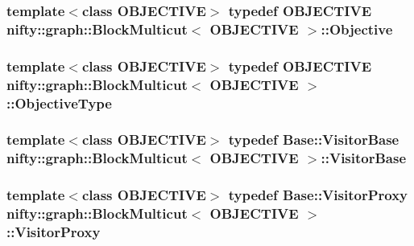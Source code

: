 \subsubsection[{Objective}]{\setlength{\rightskip}{0pt plus 5cm}template$<$class O\+B\+J\+E\+C\+T\+I\+V\+E$>$ typedef O\+B\+J\+E\+C\+T\+I\+V\+E {\bf nifty\+::graph\+::\+Block\+Multicut}$<$ O\+B\+J\+E\+C\+T\+I\+V\+E $>$\+::{\bf Objective}}\label{classnifty_1_1graph_1_1BlockMulticut_a5a0258cebb392718a4565551cd43ab89}
\hypertarget{classnifty_1_1graph_1_1BlockMulticut_a1b38a95ca33ba1eaed19e994484c58fc}{}
\subsubsection[{Objective\+Type}]{\setlength{\rightskip}{0pt plus 5cm}template$<$class O\+B\+J\+E\+C\+T\+I\+V\+E$>$ typedef O\+B\+J\+E\+C\+T\+I\+V\+E {\bf nifty\+::graph\+::\+Block\+Multicut}$<$ O\+B\+J\+E\+C\+T\+I\+V\+E $>$\+::{\bf Objective\+Type}}\label{classnifty_1_1graph_1_1BlockMulticut_a1b38a95ca33ba1eaed19e994484c58fc}
\hypertarget{classnifty_1_1graph_1_1BlockMulticut_a7338bedc1f9032f950cfc3a2ca446a17}{}
\subsubsection[{Visitor\+Base}]{\setlength{\rightskip}{0pt plus 5cm}template$<$class O\+B\+J\+E\+C\+T\+I\+V\+E$>$ typedef {\bf Base\+::\+Visitor\+Base} {\bf nifty\+::graph\+::\+Block\+Multicut}$<$ O\+B\+J\+E\+C\+T\+I\+V\+E $>$\+::{\bf Visitor\+Base}}\label{classnifty_1_1graph_1_1BlockMulticut_a7338bedc1f9032f950cfc3a2ca446a17}
\hypertarget{classnifty_1_1graph_1_1BlockMulticut_a47cf68caa6860e2e05a55b10ac73d39d}{}
\subsubsection[{Visitor\+Proxy}]{\setlength{\rightskip}{0pt plus 5cm}template$<$class O\+B\+J\+E\+C\+T\+I\+V\+E$>$ typedef {\bf Base\+::\+Visitor\+Proxy} {\bf nifty\+::graph\+::\+Block\+Multicut}$<$ O\+B\+J\+E\+C\+T\+I\+V\+E $>$\+::{\bf Visitor\+Proxy}}\label{classnifty_1_1graph_1_1BlockMulticut_a47cf68caa6860e2e05a55b10ac73d39d}
\hypertarget{classnifty_1_1graph_1_1BlockMulticut_a4bb4ad199019ba7e70c905d6316413c2}{}
